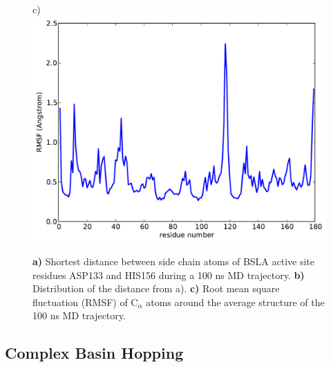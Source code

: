 \documentclass[english, a4paper, 12pt, titlepage, draft]{article}
\begin{document}
\begin{figure}
    \begin{minipage}[]{0.45\linewidth}
        \centering
        c)
        \includegraphics[width=\textwidth]{figures/BSLA_solo/BSLA_solo_rmsf.pdf} 
    \end{minipage}
    \caption{\textbf{a)} Shortest distance between side chain atoms of BSLA active site residues ASP133 and HIS156 during a 100 ns MD trajectory.
    \textbf{b)} Distribution of the distance from a).
    \textbf{c)} Root mean square fluctuation (RMSF) of C$_\alpha$ atoms around the average structure of the 100 ns MD trajectory.}
\label{fig:BSLA_solo}
\end{figure} 






\subsection{Complex Basin Hopping}
\end{document}
